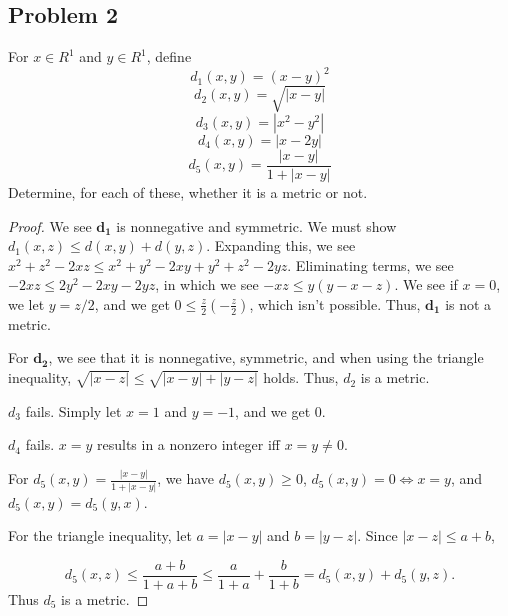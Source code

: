 \documentclass{amsart}
\begin{document}
\subsection*{Problem 2} For $x \in R^1$ and $y \in R^1$, define
\[
d_1(x,y) = (x-y)^2 
\]
\[
d_2(x,y) = \sqrt{|x-y|} 
\]
\[
d_3(x,y) = |x^2-y^2| 
\]
\[
d_4(x,y) = |x-2y| 
\]
\[
d_5(x,y) = \frac{|x-y|}{1+|x-y|}
\]
Determine, for each of these, whether it is a metric or not. 
\begin{proof}
    We see $\mathbf{d_1}$ is nonnegative and symmetric. We must show $d_1(x,z) \leq d(x,y) + d(y,z)$. Expanding this, we see $x^2 + z^2 - 2xz \leq x^2 + y^2 - 2xy + y^2 + z^2 - 2yz.$ Eliminating terms, we see $-2xz \leq 2y^2 - 2xy-2yz$, in which we see $-xz \leq y(y - x -z)$. We see if $x=0$, we let $y=z/2$, and we get $0 \leq \frac{z}{2}(-\frac{z}{2})$, which isn't possible. Thus, $\mathbf{d_1}$ is not a metric. 

    For $\mathbf{d_2}$, we see that it is nonnegative, symmetric, and when using the triangle inequality, $\sqrt{|x-z|} \leq \sqrt{|x-y|+|y-z|}$ holds. Thus, $d_2$ is a metric. 

    $d_3$ fails. Simply let $x=1$ and $y = -1$, and we get 0.

    $d_4$ fails. $x = y$ results in a nonzero integer iff $x=y\neq 0$. 

    For \(d_5(x,y)=\frac{|x-y|}{1+|x-y|}\), we have \(d_5(x,y)\geq0\), \(d_5(x,y)=0\iff x=y\), and \(d_5(x,y)=d_5(y,x)\).

For the triangle inequality, let \(a=|x-y|\) and \(b=|y-z|\). Since \(|x-z|\leq a+b\),

$$
d_5(x,z)\leq\frac{a+b}{1+a+b}\leq\frac{a}{1+a}+\frac{b}{1+b}=d_5(x,y)+d_5(y,z).
$$
Thus \(d_5\) is a metric.
\end{proof}
\end{document}
